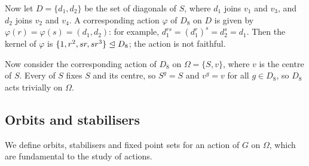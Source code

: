 \begin{example}
\begin{center}
    \end{center}

    Now let $D = \{d_1,d_2\}$ be the set of diagonals of $S$, where $d_1$ joins $v_1$ and $v_3$, and $d_2$ joins $v_2$ and $v_4$. A corresponding action $\varphi$ of $D_8$ on $D$ is given by $\varphi(r) = \varphi(s) = (d_1,d_2)$: for example, $d_1^{rs} = (d_1^r)^s = d_2^s = d_1$. Then the kernel of $\varphi$ is $\{1,r^2,\added{2}{sr,sr^3}\} \trianglelefteq D_8$; the action is not faithful.

    Now consider the corresponding action of $D_8$ on $\Omega = \{S,v\}$, where $v$ is the centre of $S$. Every  of $S$ fixes $S$ and its centre, so $S^g = S$ and $v^g = v$ for all $g \in D_8$, so $D_8$ acts trivially on $\Omega$.
\end{example}

\subsection{Orbits and stabilisers}

We define orbits, stabilisers and fixed point sets for an action of $G$ on $\Omega$, which are fundamental to the study of actions.

